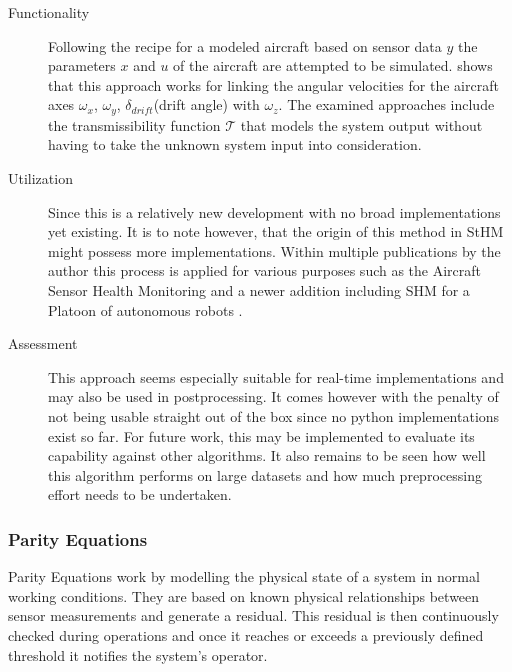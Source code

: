 \begin{description}

    \item[Functionality]\hfill

    Following the recipe for a modeled aircraft based on sensor data $y$ the parameters $x$ and $u$ of the aircraft are attempted to be simulated. \textcite{aljanaideh_aircraft_2015} shows that this approach works for linking the angular velocities for the aircraft axes $\omega_x$, $\omega_y$, $\delta_{drift}$(drift angle) with $\omega_z$. The examined approaches include the transmissibility function $\mathcal{T}$ that models the system output without having to take the unknown system input into consideration.


    \item[Utilization]\hfill

    Since this is a relatively new development with no broad implementations yet existing. It is to note however, that the origin of this method in StHM might possess more implementations. Within multiple publications by the author this process is applied for various purposes such as the Aircraft Sensor Health Monitoring \cite{aljanaideh_aircraft_2015} and a newer addition including SHM for a Platoon of autonomous robots \cite{khalil_transmissibility-based_2022}.

    \item[Assessment]\hfill

    This approach seems especially suitable for real-time implementations and may also be used in postprocessing. It comes however with the penalty of not being usable straight out of the box since no python implementations exist so far. For future work, this may be implemented to evaluate its capability against other algorithms. It also remains to be seen how well this algorithm performs on large datasets and how much preprocessing effort needs to be undertaken.
\end{description}

\subsubsection{Parity Equations}
\label{chap:parity_equation}
Parity Equations work by modelling the physical state of a system in normal working conditions. They are based on known physical relationships between sensor measurements and generate a residual. This residual is then continuously checked during operations and once it reaches or exceeds a previously defined threshold it notifies the system's operator. \cite{isermann_fault-diagnosis_2011}

